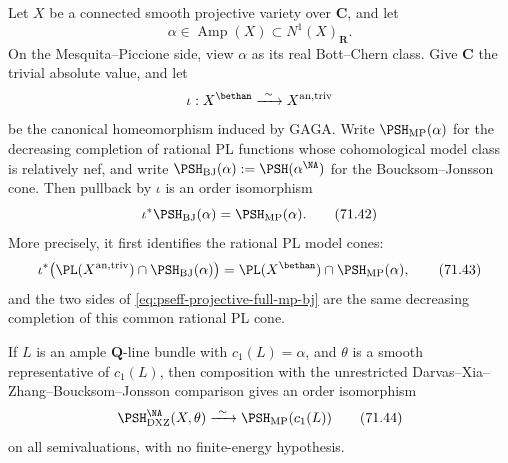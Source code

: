 \begin{theorem}\label{thm:pseff-projective-full-mp-bj}
Let $X$ be a connected smooth projective variety over $\mathbf C$, and
let
\[
                 \alpha\in\operatorname{Amp}(X)
                         \subset N^1(X)_{\mathbf R}.
\]
On the Mesquita--Piccione side, view $\alpha$ as its real Bott--Chern
class.  Give $\mathbf C$ the trivial absolute value, and let
\[
 \iota:X^{\bethan}\xrightarrow{\ \sim\ }X^{\mathrm{an,triv}}
\]
be the canonical homeomorphism induced by GAGA.  Write
$\PSH_{\mathrm{MP}}(\alpha)$ for the decreasing completion of rational
PL functions whose cohomological model class is relatively nef, and write
$\PSH_{\mathrm{BJ}}(\alpha):=\PSH(\alpha^{\NA})$ for the
Boucksom--Jonsson cone.  Then pullback by $\iota$ is an order
isomorphism
\[
 \iota^*\PSH_{\mathrm{BJ}}(\alpha)
       =\PSH_{\mathrm{MP}}(\alpha).
\tag{71.42}\label{eq:pseff-projective-full-mp-bj}
\]
More precisely, it first identifies the rational PL model cones:
\[
 \iota^*\bigl(\PL(X^{\mathrm{an,triv}})
          \cap\PSH_{\mathrm{BJ}}(\alpha)\bigr)
 =\PL(X^{\bethan})\cap\PSH_{\mathrm{MP}}(\alpha),
\tag{71.43}\label{eq:pseff-projective-model-mp-bj}
\]
and the two sides of
\eqref{eq:pseff-projective-full-mp-bj} are the same decreasing completion
of this common rational PL cone.

If $L$ is an ample $\mathbf Q$-line bundle with
$c_1(L)=\alpha$, and $\theta$ is a smooth representative of
$c_1(L)$, then composition with the unrestricted
Darvas--Xia--Zhang--Boucksom--Jonsson comparison gives an order
isomorphism
\[
 \PSH^{\NA}_{\mathrm{DXZ}}(X,\theta)
       \xrightarrow{\ \sim\ }
 \PSH_{\mathrm{MP}}(c_1(L))
\tag{71.44}\label{eq:pseff-projective-dxz-mp-bijection}
\]
on all semivaluations, with no finite-energy hypothesis.
\end{theorem}

